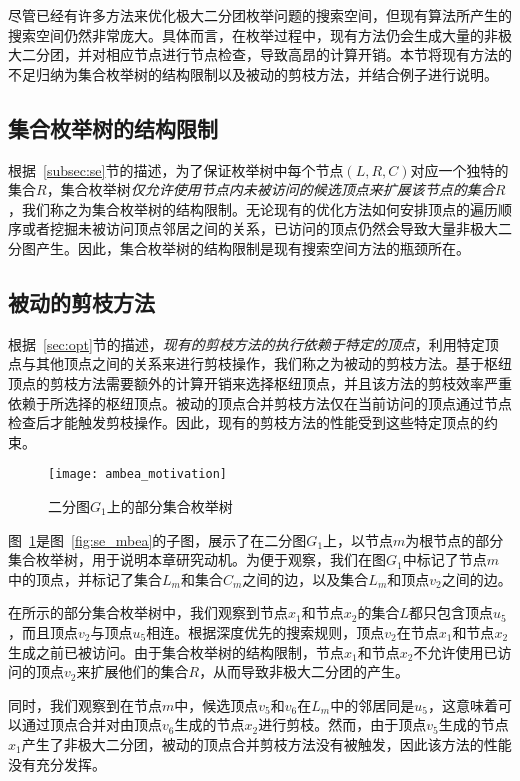 尽管已经有许多方法来优化极大二分团枚举问题的搜索空间，但现有算法所产生的搜索空间仍然非常庞大。具体而言，在枚举过程中，现有方法仍会生成大量的非极大二分团，并对相应节点进行节点检查，导致高昂的计算开销。本节将现有方法的不足归纳为集合枚举树的结构限制以及被动的剪枝方法，并结合例子进行说明。


\subsection{集合枚举树的结构限制}

根据~\ref{subsec:se}节的描述，为了保证枚举树中每个节点$(L,R,C)$对应一个独特的集合$R$，集合枚举树\emph{仅允许使用节点内未被访问的候选顶点来扩展该节点的集合$R$}，我们称之为集合枚举树的结构限制。无论现有的优化方法如何安排顶点的遍历顺序或者挖掘未被访问顶点邻居之间的关系，已访问的顶点仍然会导致大量非极大二分图产生。因此，集合枚举树的结构限制是现有搜索空间方法的瓶颈所在。

\subsection{被动的剪枝方法}

根据~\ref{sec:opt}节的描述，\emph{现有的剪枝方法的执行依赖于特定的顶点}，利用特定顶点与其他顶点之间的关系来进行剪枝操作，我们称之为被动的剪枝方法。基于枢纽顶点的剪枝方法需要额外的计算开销来选择枢纽顶点，并且该方法的剪枝效率严重依赖于所选择的枢纽顶点。被动的顶点合并剪枝方法仅在当前访问的顶点通过节点检查后才能触发剪枝操作。因此，现有的剪枝方法的性能受到这些特定顶点的约束。

\begin{figure} [h]
  \centering
  \vspace{0.1 in}
  \texttt{[image: ambea\_motivation]}
  \vspace{0.1 in}
  \caption{二分图$G_1$上的部分集合枚举树}
  \label{fig:ambea_motivation}
\end{figure}

\begin{example}
  图~\ref{fig:ambea_motivation}是图~\ref{fig:se_mbea}的子图，展示了在二分图$G_1$上，以节点$m$为根节点的部分集合枚举树，用于说明本章研究动机。为便于观察，我们在图$G_1$中标记了节点$m$中的顶点，并标记了集合$L_m$和集合$C_m$之间的边，以及集合$L_m$和顶点$v_2$之间的边。

  在所示的部分集合枚举树中，我们观察到节点$x_1$和节点$x_2$的集合$L$都只包含顶点$u_5$，而且顶点$v_2$与顶点$u_5$相连。根据深度优先的搜索规则，顶点$v_2$在节点$x_1$和节点$x_2$生成之前已被访问。由于集合枚举树的结构限制，节点$x_1$和节点$x_2$不允许使用已访问的顶点$v_2$来扩展他们的集合$R$，从而导致非极大二分团的产生。

  同时，我们观察到在节点$m$中，候选顶点$v_5$和$v_6$在$L_m$中的邻居同是$u_5$，这意味着可以通过顶点合并对由顶点$v_6$生成的节点$x_2$进行剪枝。然而，由于顶点$v_5$生成的节点$x_1$产生了非极大二分团，被动的顶点合并剪枝方法没有被触发，因此该方法的性能没有充分发挥。

\end{example}

